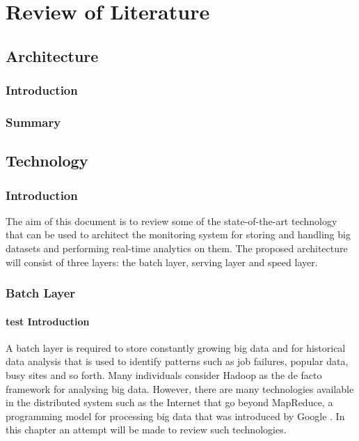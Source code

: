 \chapter{Review of Literature} \label{review-of-literature}

\section{Architecture} \label{Technology}

\subsection{Introduction} \label{subsec-lr-arc-intro}
\subsection{Summary} \label{subsec-lr-arc-summ}

\section{Technology} \label{Technology}

\subsection{Introduction} \label{subsec-lr-tech-intro}

The aim of this document is to review some of the state-of-the-art technology that can be used to architect the monitoring system for storing and handling big datasets and performing real-time analytics on them. The proposed architecture will consist of three layers: the batch layer, serving layer and speed layer.\\

\subsection{Batch Layer} \label{subsec-lr-batchlayer}

\subsubsection{test Introduction} \label{subsubsec-lr-batchlayer-intro}
A batch layer is required to store constantly growing big data and for historical data analysis that is used to identify patterns such as job failures, popular data, busy sites and so forth.  Many individuals consider Hadoop as the de facto framework for analysing big data. However, there are many technologies available in the distributed system such as the Internet that go beyond MapReduce, a programming model for processing big data that was introduced by Google \cite{mr-com} . In this chapter an attempt will be made to review such technologies.\\


